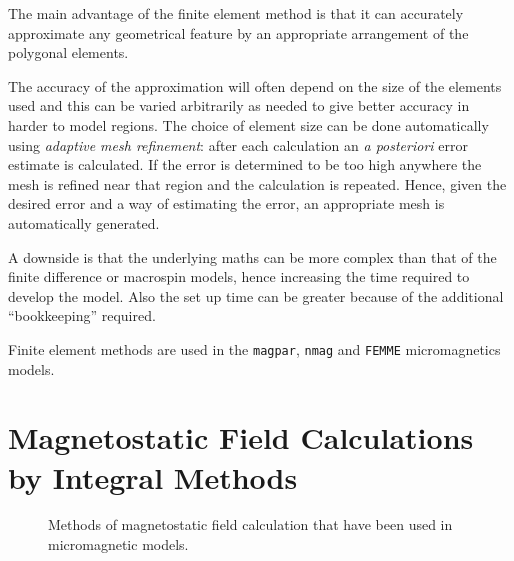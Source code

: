 The main advantage of the finite element method is that it can accurately approximate any geometrical feature by an appropriate arrangement of the polygonal elements.

The accuracy of the approximation will often depend on the size of the elements used and this can be varied arbitrarily as needed to give better accuracy in harder to model regions. The choice of element size can be done automatically using \emph{adaptive mesh refinement}: after each calculation an \emph{a posteriori} error estimate is calculated. If the error is determined to be too high anywhere the mesh is refined near that region and the calculation is repeated. Hence, given the desired error and a way of estimating the error, an appropriate mesh is automatically generated.\cite{Schrefl1999}

A downside is that the underlying maths can be more complex than that of the finite difference or macrospin models, hence increasing the time required to develop the model. Also the set up time can be greater because of the additional ``bookkeeping'' required.

Finite element methods are used in the \texttt{magpar}\cite{Scholz2003}, \texttt{nmag}\cite{Fischbacher2007} and \texttt{FEMME} micromagnetics models\cite{suessco-website}.

\section{Magnetostatic Field Calculations by Integral Methods}
\label{sec:magstat-field-calc-inte}

\begin{figure}[h]
  \centering
  \caption{Methods of magnetostatic field calculation that have been used in micromagnetic models.}
  \label{fig:types-mag-stat}
\end{figure}

